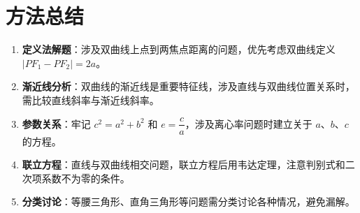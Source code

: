 \documentclass[11pt]{ctexrep}
\begin{document}
\section*{方法总结}

\begin{enumerate}
    \item \textbf{定义法解题}：涉及双曲线上点到两焦点距离的问题，优先考虑双曲线定义 $|PF_1 - PF_2| = 2a$。
    
    \item \textbf{渐近线分析}：双曲线的渐近线是重要特征线，涉及直线与双曲线位置关系时，需比较直线斜率与渐近线斜率。
    
    \item \textbf{参数关系}：牢记 $c^2 = a^2 + b^2$ 和 $e = \dfrac{c}{a}$，涉及离心率问题时建立关于 $a$、$b$、$c$ 的方程。
    
    \item \textbf{联立方程}：直线与双曲线相交问题，联立方程后用韦达定理，注意判别式和二次项系数不为零的条件。
    
    \item \textbf{分类讨论}：等腰三角形、直角三角形等问题需分类讨论各种情况，避免漏解。
\end{enumerate}
\end{document}
